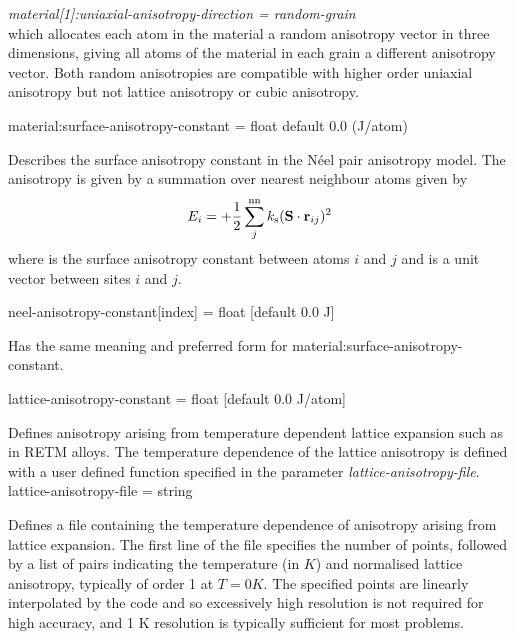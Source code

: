 \textit{material[1]:uniaxial-anisotropy-direction = random-grain}\\

which allocates each atom in the material a random anisotropy vector in three
dimensions, giving all atoms of the material in each grain a different
anisotropy vector. Both random anisotropies are compatible with higher order
uniaxial anisotropy but not lattice anisotropy or cubic anisotropy.



{\zicf material:surface-anisotropy-constant = float default 0.0 (J/atom)}
Describes the surface anisotropy constant in the N\'eel pair anisotropy model.
The anisotropy is given by a summation over nearest neighbour atoms given by
\begin{equation*}
E_i = +\frac{1}{2} \sum_j^{\mathrm{nn}} k_{\mathrm{s}} (\mathbf{S} \cdot \mathbf{r}_{ij} )^2
\end{equation*}
where \ksurf is the surface anisotropy constant between atoms $i$ and $j$ and
\rij is a unit vector between sites $i$ and $j$.

{\zicf neel-anisotropy-constant[index] = float [default 0.0 J]}
Has the same meaning and preferred form for material:surface-anisotropy-constant.

{\zicf lattice-anisotropy-constant = float [default 0.0 J/atom]}
Defines anisotropy arising from temperature dependent lattice expansion
such as in RETM alloys. The temperature dependence of the lattice anisotropy is
defined with a user defined function specified in the parameter
\textit{lattice-anisotropy-file}.\\

{\zicf lattice-anisotropy-file = string}
Defines a file containing the temperature dependence of anisotropy arising from
lattice expansion. The first line of the file specifies the number of points,
followed by a list of pairs indicating the temperature (in $K$) and normalised
lattice anisotropy, typically of order 1 at $T = 0 K$. The specified points are
linearly interpolated by the code and so excessively high resolution is not
required for high accuracy, and 1 K resolution is typically sufficient for most
problems.\\

